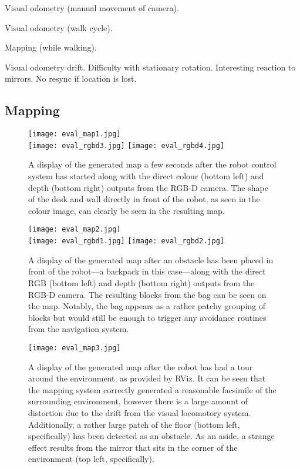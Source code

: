 Visual odometry (manual movement of camera).

Visual odometry (walk cycle).

Mapping (while walking).

Visual odometry drift. Difficulty with stationary rotation. Interesting reaction to mirrors. No resync if location is lost.

\subsection{Mapping}

\begin{figure}[!h]
	\centering
	\texttt{[image: eval\_map1.jpg]} \\
	\vspace{2pt}
	\texttt{[image: eval\_rgbd3.jpg]}
	\texttt{[image: eval\_rgbd4.jpg]}
	\caption{A display of the generated map a few seconds after the robot control system has started along with the direct colour (bottom left) and depth (bottom right) outputs from the RGB-D camera. The shape of the desk and wall directly in front of the robot, as seen in the colour image, can clearly be seen in the resulting map.}
	\label{fig:eval_map_bag}
\end{figure}

\begin{figure}[!h]
	\centering
	\texttt{[image: eval\_map2.jpg]} \\
	\vspace{2pt}
	\texttt{[image: eval\_rgbd1.jpg]}
	\texttt{[image: eval\_rgbd2.jpg]}
	\caption{A display of the generated map after an obstacle has been placed in front of the robot---a backpack in this case---along with the direct RGB (bottom left) and depth (bottom right) outputs from the RGB-D camera. The resulting blocks from the bag can be seen on the map. Notably, the bag appears as a rather patchy grouping of blocks but would still be enough to trigger any avoidance routines from the navigation system.}
	\label{fig:eval_map_nobag}
\end{figure}

\begin{figure}[!h]
	\centering
	\texttt{[image: eval\_map3.jpg]}
	\caption{A display of the generated map after the robot has had a tour around the environment, as provided by RViz. It can be seen that the mapping system correctly generated a reasonable facsimile of the surrounding environment, however there is a large amount of distortion due to the drift from the visual locomotory system. Additionally, a rather large patch of the floor (bottom left, specifically) has been detected as an obstacle. As an aside, a strange effect results from the mirror that sits in the corner of the environment (top left, specifically).}
	\label{fig:eval_map_room}
\end{figure}

